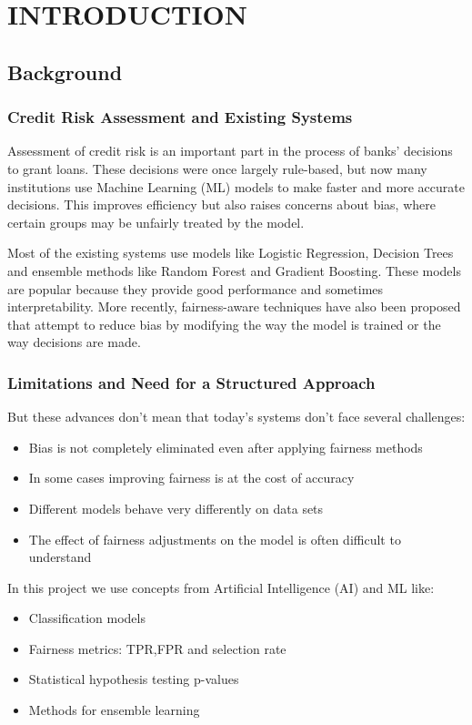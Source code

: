 \chapter{\MakeUppercase{Introduction}}
\justifying

\section{Background}

\subsection{Credit Risk Assessment and Existing Systems}

Assessment of credit risk is an important part in the process of banks’ decisions to grant loans. These decisions were once largely rule-based, but now many institutions use Machine Learning (ML) models to make faster and more accurate decisions. This improves efficiency but also raises concerns about bias, where certain groups may be unfairly treated by the model.

Most of the existing systems use models like Logistic Regression, Decision Trees and ensemble methods like Random Forest and Gradient Boosting. These models are popular because they provide good performance and sometimes interpretability. More recently, fairness-aware techniques have also been proposed that attempt to reduce bias by modifying the way the model is trained or the way decisions are made.

\subsection{Limitations and Need for a Structured Approach}

But these advances don’t mean that today’s systems don’t face several challenges:
\begin{itemize}
    \item Bias is not completely eliminated even after applying fairness methods
    \item In some cases improving fairness is at the cost of accuracy
    \item Different models behave very differently on data sets
    \item The effect of fairness adjustments on the model is often difficult to understand
\end{itemize}

In this project we use concepts from Artificial Intelligence (AI) and ML like:
\begin{itemize}
    \item Classification models
    \item Fairness metrics: TPR,FPR and selection rate
    \item Statistical hypothesis testing p-values
    \item Methods for ensemble learning
\end{itemize}

